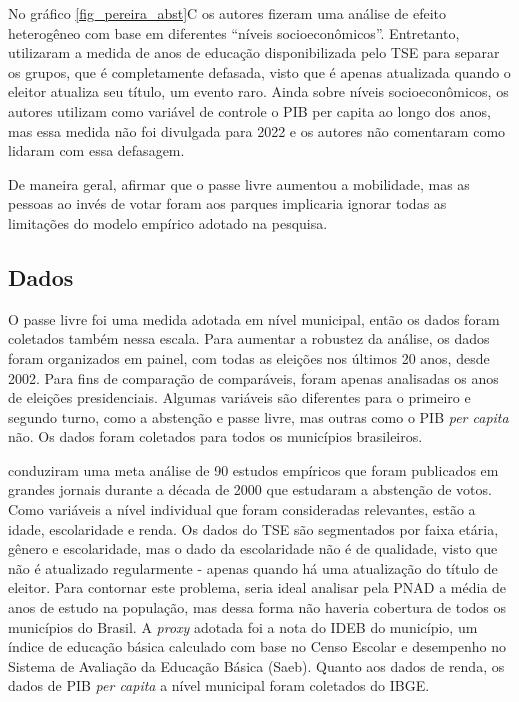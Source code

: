 No gráfico \ref{fig_pereira_abst}C os autores fizeram uma análise de efeito heterogêneo com base em diferentes ``níveis socioeconômicos''. Entretanto, utilizaram a medida de anos de educação disponibilizada pelo TSE para separar os grupos, que é completamente defasada, visto que é apenas atualizada quando o eleitor atualiza seu título, um evento raro. Ainda sobre níveis socioeconômicos, os autores utilizam como variável de controle o PIB per capita ao longo dos anos, mas essa medida não foi divulgada para 2022 e os autores não comentaram como lidaram com essa defasagem.

De maneira geral, afirmar que o passe livre aumentou a mobilidade, mas as pessoas ao invés de votar foram aos parques implicaria ignorar todas as limitações do modelo empírico adotado na pesquisa.

\subsection{Dados}

O passe livre foi uma medida adotada em nível municipal, então os dados foram coletados também nessa escala. Para aumentar a robustez da análise, os dados foram organizados em painel, com todas as eleições nos últimos 20 anos, desde 2002. Para fins de comparação de comparáveis, foram apenas analisadas os anos de eleições presidenciais. Algumas variáveis são diferentes para o primeiro e segundo turno, como a abstenção e passe livre, mas outras como o PIB \textit{per capita} não. Os dados foram coletados para todos os municípios brasileiros.



\textcite{smets2013embarrassment} conduziram uma meta análise de 90 estudos empíricos que foram publicados em grandes jornais durante a década de 2000 que estudaram a abstenção de votos. Como variáveis a nível individual que foram consideradas relevantes, estão a idade, escolaridade e renda. Os dados do TSE são segmentados por faixa etária, gênero e escolaridade, mas o dado da escolaridade não é de qualidade, visto que não é atualizado regularmente - apenas quando há uma atualização do título de eleitor. Para contornar este problema, seria ideal analisar pela PNAD a média de anos de estudo na população, mas dessa forma não haveria cobertura de todos os municípios do Brasil. A \textit{proxy} adotada foi a nota do IDEB do município, um índice de educação básica calculado com base no Censo Escolar e desempenho no Sistema de Avaliação da Educação Básica (Saeb). Quanto aos dados de renda, os dados de PIB \textit{per capita} a nível municipal foram coletados do IBGE.

